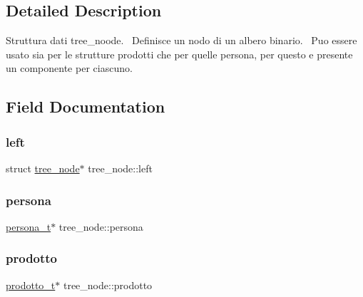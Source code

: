 \subsection{Detailed Description}
Struttura dati tree\+\_\+noode.~\newline
Definisce un nodo di un albero binario.~\newline
Puo\textquotesingle{} essere usato sia per le strutture prodotti che per quelle persona, per questo e\textquotesingle{} presente un componente per ciascuno. 

\subsection{Field Documentation}
\mbox{\label{structtree__node_a3e30a7ba2a4e3286ec7394ba920f2893}} 
\subsubsection{\texorpdfstring{left}{left}}
{\footnotesize\ttfamily struct \hyperlink{structtree__node}{tree\+\_\+node}$\ast$ tree\+\_\+node\+::left}

\mbox{\label{structtree__node_a8aa6034178fc4abc1453c134519d0b92}} 
\subsubsection{\texorpdfstring{persona}{persona}}
{\footnotesize\ttfamily \hyperlink{head__strutture_8h_a58439881922e3f6e7ed51e352f2a0c1c}{persona\+\_\+t}$\ast$ tree\+\_\+node\+::persona}

\mbox{\label{structtree__node_adf54e2cdcc96af8fa0e24eac862bf849}} 
\subsubsection{\texorpdfstring{prodotto}{prodotto}}
{\footnotesize\ttfamily \hyperlink{head__strutture_8h_afec16ee1fceb6c05f4be3538f36b1997}{prodotto\+\_\+t}$\ast$ tree\+\_\+node\+::prodotto}

